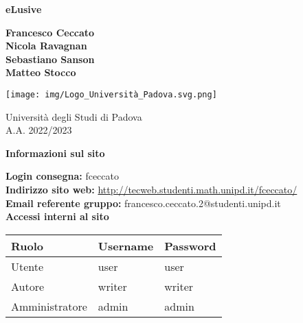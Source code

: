 \documentclass[11pt, a4paper]{article}
\begin{document}
\begin{titlepage}
    \begin{center}
        \vspace*{1cm}
            
        \Huge
        \textbf{eLusive}
            
        \vspace{1.5cm}
        
        \Large
        \textbf{Francesco Ceccato} \\
        \textbf{Nicola Ravagnan} \\
        \textbf{Sebastiano Sanson} \\
        \textbf{Matteo Stocco}
            
        \vfill
            
        \vspace{0.8cm}
            
       \texttt{[image: img/Logo\_Università\_Padova.svg.png]}
            
        \Large
        Università degli Studi di Padova \\
        A.A. 2022/2023
            
    \end{center}
\end{titlepage}


\clearpage

\begin{center}
	\textbf{\Large{Informazioni sul sito}}

    \vspace{0.5cm}

	\textbf{Login consegna:} fceccato \\
	\textbf{Indirizzo sito web:} \url{http://tecweb.studenti.math.unipd.it/fceccato/}\\
	\textbf{Email referente gruppo:} francesco.ceccato.2@studenti.unipd.it \\
    \vspace{1cm}
    \textbf{Accessi interni al sito}
    \begin{longtable}{|l|l|l|}
        \hline
        \rowcolor[HTML]{220058}
        {\color[HTML]{FFFFFF} Ruolo} & {\color[HTML]{FFFFFF} Username} & {\color[HTML]{FFFFFF} Password} \\ \hline
        Utente         & user     & user    \\ \hline
        Autore         & writer   & writer  \\ \hline
        Amministratore & admin    & admin   \\ \hline
    \end{longtable}
\end{center}

\clearpage  

\tableofcontents

\clearpage











\end{document}
